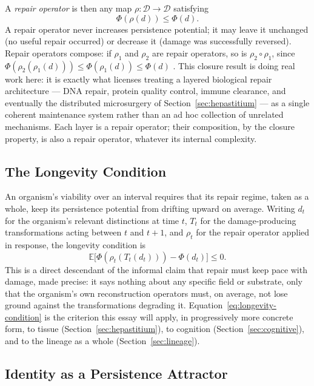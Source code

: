 \documentclass[12pt]{article}
\begin{document}
A \emph{repair operator} is then any map $\rho : \mathcal{D} \to \mathcal{D}$ satisfying
\begin{equation}
\Phi(\rho(d)) \le \Phi(d).
\label{eq:repair-operator}
\end{equation}
A repair operator never increases persistence potential; it may leave it unchanged (no useful repair occurred) or decrease it (damage was successfully reversed). Repair operators compose: if $\rho_1$ and $\rho_2$ are repair operators, so is $\rho_2 \circ \rho_1$, since $\Phi(\rho_2(\rho_1(d))) \le \Phi(\rho_1(d)) \le \Phi(d)$ \cite{flyxion2026persistence}. This closure result is doing real work here: it is exactly what licenses treating a layered biological repair architecture --- DNA repair, protein quality control, immune clearance, and eventually the distributed microsurgery of Section~\ref{sec:hepastitium} --- as a single coherent maintenance system rather than an ad hoc collection of unrelated mechanisms. Each layer is a repair operator; their composition, by the closure property, is also a repair operator, whatever its internal complexity.

\subsection{The Longevity Condition}

An organism's viability over an interval requires that its repair regime, taken as a whole, keep its persistence potential from drifting upward on average. Writing $d_t$ for the organism's relevant distinctions at time $t$, $T_t$ for the damage-producing transformations acting between $t$ and $t+1$, and $\rho_t$ for the repair operator applied in response, the longevity condition is
\begin{equation}
\mathbb{E}\big[\Phi(\rho_t(T_t(d_t))) - \Phi(d_t)\big] \le 0.
\label{eq:longevity-condition}
\end{equation}
This is a direct descendant of the informal claim that repair must keep pace with damage, made precise: it says nothing about any specific field or substrate, only that the organism's own reconstruction operators must, on average, not lose ground against the transformations degrading it. Equation~\eqref{eq:longevity-condition} is the criterion this essay will apply, in progressively more concrete form, to tissue (Section~\ref{sec:hepastitium}), to cognition (Section~\ref{sec:cognitive}), and to the lineage as a whole (Section~\ref{sec:lineage}).

\subsection{Identity as a Persistence Attractor}
\end{document}
